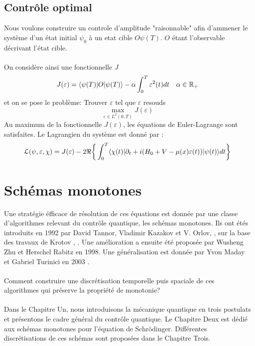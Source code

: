 \subsection*{Contrôle optimal}
Nous voulons construire un controle d'amplitude "raisonnable" afin d'ammener le système d'un état initial $\psi_0$ à un etat cible $O\psi(T)$. $O$ étant l'observable décrivant l'état cible.\\\\

On considère ainsi une fonctionnelle $J$
\begin{equation}
J(\varepsilon) = \langle \psi(T)|O|\psi(T) \rangle - \alpha \int_{0}^{T}\varepsilon^2(t)dt \quad \alpha \in \mathbb R_+
\end{equation}
et on se pose le problème: Trouver $\varepsilon$ tel que $\varepsilon$ resouds
$$ \max_{\varepsilon \in L^2(0,T)} J(\varepsilon)$$
Au maximum de la fonctionnelle $J(\varepsilon)$, les équations de Euler-Lagrange sont satisfaites. Le Lagrangien du système est donné par :
\begin{equation} \label{lagrangien}
\mathcal{L}(\psi,\varepsilon,\chi)= J(\varepsilon)\\
-2\Re \bigg\{ \int_{0}^{T}\langle \chi (t)|\partial_{t}+i(H_0+V-\mu(x)\varepsilon(t))|\psi(t) \rangle dt \bigg\}
\end{equation}
\section*{Schémas monotones}
Une stratégie éfficace de résolution de ces équations est donnée par une classe d’algorithmes relevant du contrôle quantique, les schémas monotones. Ils ont étés introduits en 1992 par David Tannor, Vladimir Kazakov et V. Orlov,  \cite{Tannor}, sur la base des travaux de Krotov \cite{Krotov1}, \cite{Krotov2}. Une amélioration a ensuite été proposée par Wusheng Zhu et Herschel Rabitz \cite{Zhu} en 1998. Une généralisation est donnée par Yvon Maday et Gabriel Turinici en 2003 \cite{Maday}.\\\\

Comment construire une discrétisation temporelle puis spaciale de ces algorithmes qui préserve la propriété de monotonie?\\\\

Dans le Chapitre Un, nous introduisons la mécanique quantique en trois postulats et présentons le cadre général du contrôle quantique. Le Chapitre Deux est dédié aux schémas monotones pour l'équation de Schrödinger.
Différentes discrétisations de ces schémas sont proposées dans le Chapitre Trois.